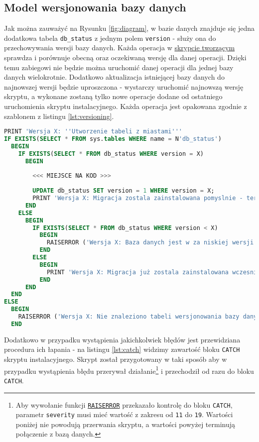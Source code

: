 \subsection{Model wersjonowania bazy danych}

Jak można zauważyć na Rysunku \ref{fig:diagram}, w bazie danych znajduje się jedna dodatkowa tabela \texttt{db\_status} z jednym polem \texttt{version} - służy ona do przechowywania wersji bazy danych.
Każda operacja w \href{run:skrypt_tworzacy_obiekty_w_bazie_danych.sql}{skrypcie tworzącym} sprawdza i porównuje obecną oraz oczekiwaną wersję dla danej operacji. 
Dzięki temu zabiegowi nie będzie można uruchomić danej operacji dla jednej bazy danych wielokrotnie. Dodatkowo aktualizacja istniejącej bazy danych do najnowszej wersji będzie uproszczona - wystarczy uruchomić najnowszą wersję skryptu, a wykonane zostaną tylko nowe operacje dodane od ostatniego uruchomienia skryptu instalacyjnego.
Każda operacja jest opakowana zgodnie z szablonem z listingu \ref{lst:versioning}.

\begin{lstlisting}[language=SQL, caption=Szablon kodu wersjonowanego, label={lst:versioning}]
PRINT 'Wersja X: ''Utworzenie tabeli z miastami'''
IF EXISTS(SELECT * FROM sys.tables WHERE name = N'db_status')
  BEGIN
    IF EXISTS(SELECT * FROM db_status WHERE version = X)
      BEGIN
		
		<<< MIEJSCE NA KOD >>>        
            
        UPDATE db_status SET version = 1 WHERE version = X;
        PRINT 'Wersja X: Migracja zostala zainstalowana pomyslnie - teraz baza jest w wersji X';
      END
    ELSE
      BEGIN
        IF EXISTS(SELECT * FROM db_status WHERE version < X)
          BEGIN
            RAISERROR ('Wersja X: Baza danych jest w za niskiej wersji (wymagana jest wersja X) aby zainstalowac migracje', 11, 2);
          END
        ELSE
          BEGIN
            PRINT 'Wersja X: Migracja już zostala zainstalowana wczesniej';
          END
      END
  END
ELSE
  BEGIN
    RAISERROR ('Wersja X: Nie znaleziono tabeli wersjonowania bazy danych', 11, 1);
  END
\end{lstlisting}

Dodatkowo w przypadku wystąpienia jakichkolwiek błędów jest przewidziana procedura ich łapania - na listingu \ref{lst:catch} widzimy zawartość bloku \texttt{CATCH} skryptu instalacyjnego. Skrypt został przygotowany w taki sposób aby w przypadku wystąpienia błędu przerywał działanie\footnote{Aby wywołanie funkcji \href{https://docs.microsoft.com/en-us/sql/t-sql/language-elements/raiserror-transact-sql?view=sql-server-2017}{\texttt{RAISERROR}} przekazało kontrolę do bloku \texttt{CATCH}, parametr \texttt{severity} musi mieć wartość z zakresu od \texttt{11} do \texttt{19}. Wartości poniżej nie powodują przerwania skryptu, a wartości powyżej terminują połączenie z bazą danych.} i przechodził od razu do bloku \texttt{CATCH}.

